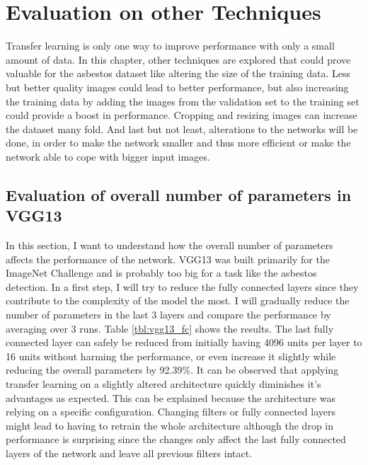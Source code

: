\chapter{Evaluation on other Techniques}

Transfer learning is only one way to improve performance with only a small amount of data. In this chapter, other techniques are explored that could prove valuable for the asbestos dataset like altering the size of the training data. Less but better quality images could lead to better performance, but also increasing the training data by adding the images from the validation set to the training set could provide a boost in performance. Cropping and resizing images can increase the dataset many fold. And last but not least, alterations to the networks will be done, in order to make the network smaller and thus more efficient or make the network able to cope with bigger input images.

\section{Evaluation of overall number of parameters in VGG13}

In this section, I want to understand how the overall number of parameters affects the performance of the network. VGG13 was built primarily for the ImageNet Challenge and is probably too big for a task like the asbestos detection. In a first step, I will try to reduce the fully connected layers since they contribute to the complexity of the model the most. I will gradually reduce the number of parameters in the last 3 layers and compare the performance by averaging over 3 runs. Table \ref{tbl:vgg13_fc} shows the results. The last fully connected layer can safely be reduced from initially having 4096 units per layer to 16 units without harming the performance, or even increase it slightly while reducing the overall parameters by 92.39\%. It can be observed that applying transfer learning on a slightly altered architecture quickly diminishes it's advantages as expected. This can be explained because the architecture was relying on a specific configuration. Changing filters or fully connected layers might lead to having to retrain the whole architecture although the drop in performance is surprising since the changes only affect the last fully connected layers of the network and leave all previous filters intact.


